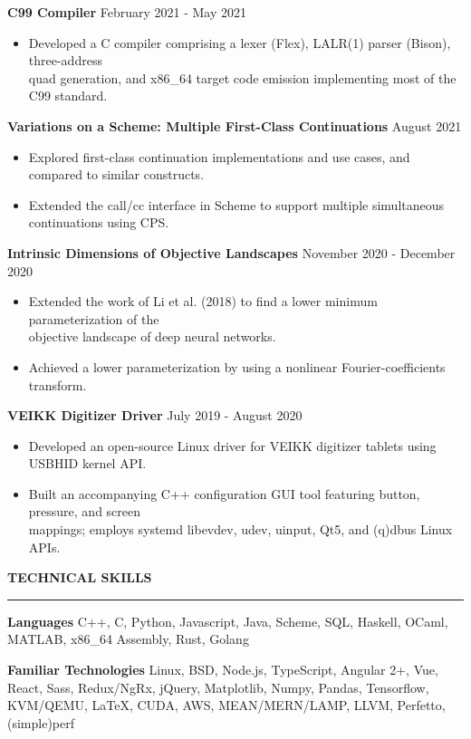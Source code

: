 \documentclass[]{article}
\newcommand{\br}{\vspace{10pt}}
\newcommand{\brs}{\vspace{3pt}}
\newcommand{\hr}{\vspace{4pt}\hrule\vspace{4pt}}
\begin{document}
\brs

\textbf{C99 Compiler}
\hfill
February 2021 - May 2021
\begin{itemize}
\item Developed a C compiler comprising a lexer (Flex), LALR(1) parser (Bison),
  three-address \\ quad generation, and x86\_64 target code emission
  implementing most of the C99 standard.
\end{itemize}

\brs

\textbf{Variations on a Scheme: Multiple First-Class Continuations}
\hfill
August 2021
\begin{itemize}
\item Explored first-class continuation implementations and use cases, and compared to similar constructs.
\item Extended the call/cc interface in Scheme to support multiple simultaneous continuations using CPS.
\end{itemize}

\brs

\textbf{Intrinsic Dimensions of Objective Landscapes}
\hfill
November 2020 - December 2020
\begin{itemize}
\item Extended the work of Li et al. (2018) to find a lower minimum parameterization of the \\
  objective landscape of deep neural networks.
\item Achieved a lower parameterization by using a nonlinear Fourier-coefficients transform.
\end{itemize}

\brs

\textbf{VEIKK Digitizer Driver}
\hfill
July 2019 - August 2020
\begin{itemize}
\item Developed an open-source Linux driver for VEIKK digitizer tablets using USBHID kernel
  API.
\item Built an accompanying C++ configuration GUI tool featuring button, pressure, and screen \\
  mappings; employs systemd libevdev, udev, uinput, Qt5, and (q)dbus Linux APIs.
\end{itemize}

\br

\textbf{TECHNICAL SKILLS}
\hr

\textbf{Languages} C++, C, Python, Javascript, Java, Scheme, SQL, Haskell, OCaml,
MATLAB, x86\_64 Assembly, Rust, Golang

\brs

\textbf{Familiar Technologies} Linux, BSD, Node.js, TypeScript, Angular 2+, Vue, React, Sass, Redux/NgRx, jQuery, Matplotlib, Numpy, Pandas, Tensorflow, KVM/QEMU, \LaTeX, CUDA, AWS, MEAN/MERN/LAMP, LLVM, Perfetto, (simple)perf
\end{document}

